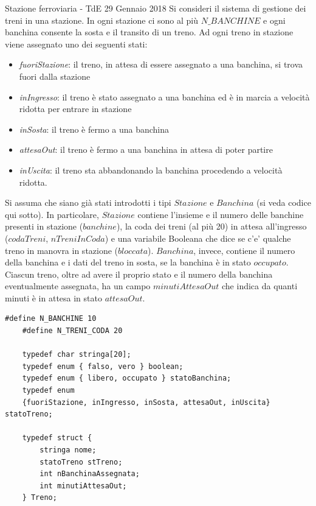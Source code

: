 \documentclass[aspectratio=169,]{beamer}
\begin{document}
\begin{frame}{Stazione ferroviaria - TdE 29 Gennaio 2018}
    Si consideri il sistema di gestione dei treni in una stazione.
    In ogni stazione ci sono al più $N\_BANCHINE$ e ogni banchina consente la sosta e il transito di un treno. Ad ogni treno in stazione viene assegnato uno dei seguenti stati:
    \begin{itemize}
        \item \emph{fuoriStazione}: il treno, in attesa di essere assegnato a una banchina, si trova fuori dalla stazione
        \item \emph{inIngresso}: il treno è stato assegnato a una banchina ed è in marcia a velocità ridotta per entrare in stazione
        \item \emph{inSosta}: il treno è fermo a una banchina
        \item \emph{attesaOut}: il treno è fermo a una banchina in attesa di poter partire
        \item \emph{inUscita}: il treno sta abbandonando la banchina procedendo a velocità ridotta.
    \end{itemize}

    Si assuma che siano già stati introdotti i tipi $Stazione$ e $Banchina$ (si veda codice qui sotto). In particolare, $Stazione$ contiene l'insieme e il numero delle banchine presenti in stazione ($banchine$), la coda dei treni (al più 20) in attesa all'ingresso ($codaTreni$, $nTreniInCoda$) e una variabile Booleana che dice se c'e' qualche treno in manovra in stazione ($bloccata$).
    $Banchina$, invece, contiene il numero della banchina e i dati del treno in sosta, se la banchina è in stato $occupato$. Ciascun treno, oltre ad avere il proprio stato e il numero della banchina eventualmente assegnata, ha un campo $minutiAttesaOut$ che indica da quanti minuti è in attesa in stato $attesaOut$.

    \begin{lstlisting}[style=CStyle, basicstyle=\small]
    #define N_BANCHINE 10
    #define N_TRENI_CODA 20

    typedef char stringa[20];
    typedef enum { falso, vero } boolean;
    typedef enum { libero, occupato } statoBanchina;
    typedef enum
    {fuoriStazione, inIngresso, inSosta, attesaOut, inUscita} statoTreno;

    typedef struct {
        stringa nome;
        statoTreno stTreno;
        int nBanchinaAssegnata;
        int minutiAttesaOut;
    } Treno;


\end{lstlisting}
\end{frame}
\end{document}
